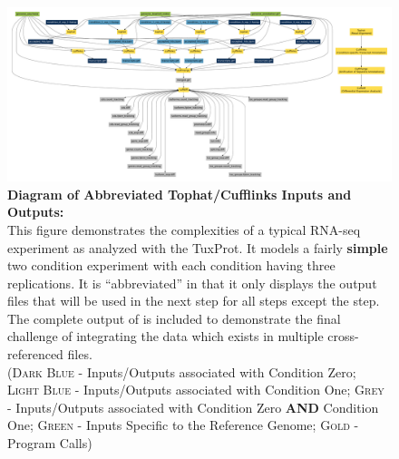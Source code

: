 

\begin{landscape}
 
 
 \begin{figure}[hp]
\centering
\includegraphics[width=\linewidth]{figures/figs/tuxedo_dot/707354_6/tophat_cufflinks_ins_outs.pdf}
\caption[Diagram of Abbreviated Tophat/Cufflinks Inputs and Outputs]{\sf \textbf{Diagram of Abbreviated Tophat/Cufflinks Inputs and Outputs:}\\
	This figure demonstrates the complexities of a typical RNA-seq experiment as analyzed with the \gls{TuxProt}. It models a fairly \textbf{simple} two condition experiment with each condition having three replications. It is ``abbreviated'' in that it only displays the output files that will be used in the next step for all steps except the  step. The complete output of  is included to demonstrate the final challenge of integrating the data which exists in multiple cross-referenced files.\\ 
	(\textsc{Dark Blue} - Inputs/Outputs associated with Condition Zero; 
	\textsc{Light Blue} - Inputs/Outputs associated with Condition One; 
	\textsc{Grey} - Inputs/Outputs associated with Condition Zero \textbf{AND} Condition One; 
	\textsc{Green} - Inputs Specific to the Reference Genome; 
	\textsc{Gold} - Program Calls)
}
	\label{fig:tuxedo}
\end{figure}
 
 
 
\end{landscape}

